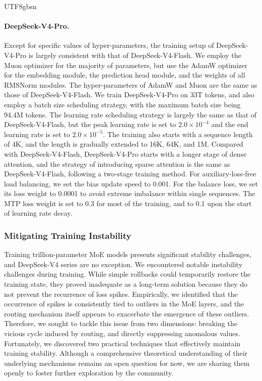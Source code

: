 \documentclass[11pt, a4paper, logo, copyright, nonumbering]{deepseek}
\newcommand{\dsviv}{DeepSeek-V4}
\newcommand{\dsvivp}{DeepSeek-V4-Pro}
\newcommand{\dsvivf}{DeepSeek-V4-Flash}
\newcommand{\dsvivptoken}{33T}
\begin{document}
\begin{CJK*}{UTF8}{gbsn}
\paragraph{\dsvivp{}.}
Except for specific values of hyper-parameters, the training setup of \dsvivp{} is largely consistent with that of \dsvivf{}.
We employ the Muon optimizer for the majority of parameters, but use the AdamW optimizer for the embedding module, the prediction head module, and the weights of all RMSNorm modules. 
The hyper-parameters of AdamW and Muon are the same as those of \dsvivf{}. 
We train \dsvivp{} on \dsvivptoken{} tokens, and also employ a batch size scheduling strategy, with the maximum batch size being 94.4M tokens.
The learning rate scheduling strategy is largely the same as that of \dsvivf{}, but the peak learning rate is set to $2.0 \times 10^{-4}$ and the end learning rate is set to $2.0 \times 10^{-5}$. 
The training also starts with a sequence length of 4K, and the length is gradually extended to 16K, 64K, and 1M. 
Compared with \dsvivf{}, \dsvivp{} starts with a longer stage of dense attention, and the strategy of introducing sparse attention is the same as \dsvivf{}, following a two-stage training method. 
For auxiliary-loss-free load balancing, we set the bias update speed to 0.001. 
For the balance loss, we set its loss weight to 0.0001 to avoid extreme imbalance within single sequences. 
The MTP loss weight is set to 0.3 for most of the training, and to 0.1 upon the start of learning rate decay. 

\subsubsection{Mitigating Training Instability}

Training trillion-parameter MoE models presents significant stability challenges, and \dsviv{} series are no exception. 
We encountered notable instability challenges during training. 
While simple rollbacks could temporarily restore the training state, they proved inadequate as a long-term solution because they do not prevent the recurrence of loss spikes.
Empirically, we identified that the occurrence of spikes is consistently tied to outliers in the MoE layers, and the routing mechanism itself appears to exacerbate the emergence of these outliers. 
Therefore, we sought to tackle this issue from two dimensions: breaking the vicious cycle induced by routing, and directly suppressing anomalous values. 
Fortunately, we discovered two practical techniques that effectively maintain training stability. 
Although a comprehensive theoretical understanding of their underlying mechanisms remains an open question for now, we are sharing them openly to foster further exploration by the community.


\end{CJK*}
\end{document}
